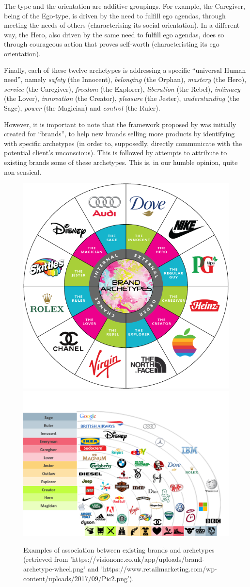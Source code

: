 \documentclass[]{book}
\begin{document}
The type and the orientation are additive groupings. For example, the Caregiver, being of the Ego-type, is driven by the need to fulfill ego agendas, through meeting the needs of others (characterising its social orientation). In a different way, the Hero, also driven by the same need to fulfill ego agendas, does so through courageous action that proves self-worth (characteristing its ego orientation).

Finally, each of these twelve archetypes is addressing a specific ``universal Human need'', namely \emph{safety} (the Innocent), \emph{belonging} (the Orphan), \emph{mastery} (the Hero), \emph{service} (the Caregiver), \emph{freedom} (the Explorer), \emph{liberation} (the Rebel), \emph{intimacy} (the Lover), \emph{innovation} (the Creator), \emph{pleasure} (the Jester), \emph{understanding} (the Sage), \emph{power} (the Magician) and \emph{control} (the Ruler).

However, it is important to note that the framework proposed by \citet{mark2001hero} was initially created for ``brands'', to help new brands selling more products by identifying with specific archetypes (in order to, supposedly, directly communicate with the potential client's unconscious). This is followed by attempts to attribute to existing brands some of these archetypes. This is, in our humble opinion, quite non-sensical.

\begin{figure}

{\centering \includegraphics[width=0.49\linewidth]{img/brand_archetypes1} \includegraphics[width=0.49\linewidth]{img/brand_archetypes2} 

}

\caption{Examples of association between existing brands and archetypes (retrieved from 'https://visionone.co.uk/app/uploads/brand-archetype-wheel.png' and 'https://www.retailmarketing.com/wp-content/uploads/2017/09/Pic2.png').}\label{fig:unnamed-chunk-4}
\end{figure}
\end{document}
